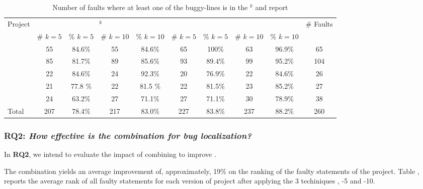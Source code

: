 \documentclass{article}
\begin{document}
\begin{table}[h]
	\small
	\centering
	  \begin{tabular}{l|cccc|cccc|c}
		\toprule
		\multirow{2}{*}{Project}            & \multicolumn{4}{c|}{\sfl{}$^{k}$}  & \multicolumn{4}{c|}{\combpar{k}} & \multirow{2}{*}{\# Faults} \\

		            & \# $k = 5$ & \% $k = 5$ & \# $k = 10$ & \% $k = 10$
					& \# $k = 5$ & \% $k = 5$ & \# $k = 10$ & \% $k = 10$ &  \\
		\midrule
		 \lang{}         &  55 & 84.6\%  & 55  & 84.6\%
		 				& 65 & 100\% & 63 & 96.9\% & 65      \\
		\cmath{}           & 85 & 81.7\%  & 89 & 85.6\%
						& 93 & 89.4\% & 99 & 95.2\% & 104  \\   %
		\chart{}          & 22 & 84.6\% & 24 & 92.3\%
						& 20 & 76.9\% & 22 & 84.6\% & 26    \\
		\jtime{}          & 21 & 77.8 \% & 22 & 81.5 \%
				& 22 & 81.5\% & 23 & 85.2\% & 27     \\
		 \mockito{}      & 24  & 63.2\% & 27 & 71.1\%
		 				& 27 & 71.1\% & 30 & 78.9\% & 38 \\\midrule
	 Total      & 207  & 78.4\% & 217 & 83.0\%
	 				& 227 & 83.8\% & 237 & 88.2\% & 260 \\
		\bottomrule
	\end{tabular}
  \caption {Number of faults where at least one of the buggy-lines is in the \sfl{}$^{k}$ and  report}
  \label{table:fsws}
\end{table}

\subsubsection{RQ2: \textit{How effective is the \comb{} combination for bug localization?}}


In \textbf{RQ2}, we intend to evaluate the impact of combining \ds{} to improve \ds{}.

The \comb{} combination yields an average improvement of, approximately, 19\% on the ranking of the faulty statements of the \chart{}
project. Table , reports the average rank of all faulty statements for each version of \chart{} project after
applying the 3 techiniques \sfl{}, \comb{}-5 and \comb{}-10.
\end{document}
